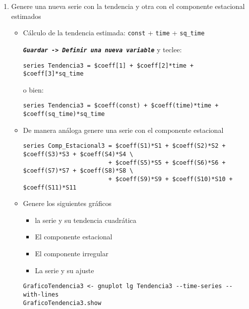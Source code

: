 \documentclass[11pt]{article}
\begin{document}
\begin{enumerate}
\item Genere una nueva serie con la tendencia y otra con el componente estacional estimados
\label{sec:orgcd802ab}
\begin{itemize}
\item Cálculo de la tendencia estimada:  \texttt{const} +  \texttt{time} +  \texttt{sq\_time}

\textbf{\emph{\texttt{Guardar -> Definir una nueva variable}}} y teclee:
{\vspace{1pt} \footnotesize \color{gray!70!black} \color{gray!70!black}
\begin{verbatim}
series Tendencia3 = $coeff[1] + $coeff[2]*time + $coeff[3]*sq_time
\end{verbatim}
}
o bien:
{\vspace{1pt} \footnotesize \color{gray!70!black} \color{gray!70!black}
\begin{verbatim}
series Tendencia3 = $coeff(const) + $coeff(time)*time + $coeff(sq_time)*sq_time
\end{verbatim}
}

\item De manera análoga genere una serie con el componente estacional

{\vspace{1pt} \footnotesize \color{gray!70!black} \color{gray!70!black}
\begin{verbatim}
series Comp_Estacional3 = $coeff(S1)*S1 + $coeff(S2)*S2 + $coeff(S3)*S3 + $coeff(S4)*S4 \
                        + $coeff(S5)*S5 + $coeff(S6)*S6 + $coeff(S7)*S7 + $coeff(S8)*S8 \
                        + $coeff(S9)*S9 + $coeff(S10)*S10 + $coeff(S11)*S11 
\end{verbatim}
}

\item Genere los siguientes gráficos
\begin{itemize}
\item la serie y su tendencia cuadrática

\item El componente estacional

\item El componente irregular

\item La serie y su ajuste
\end{itemize}

{\vspace{1pt} \footnotesize \color{gray!70!black} \color{gray!70!black}
\begin{verbatim}
GraficoTendencia3 <- gnuplot lg Tendencia3 --time-series --with-lines
GraficoTendencia3.show


\end{verbatim}}
\end{itemize}
\end{enumerate}
\end{document}
